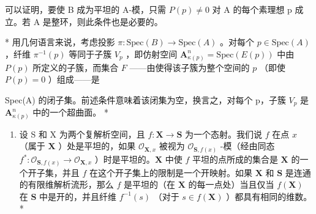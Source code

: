 可以证明，要使 B 成为平坦的 A-模，只需 \(P(p) \neq 0\) 对 A 的每个素理想 p 成立。若 A 是整环，则此条件也是必要的。

* 用几何语言来说，考虑投影 \(\pi: \text{Spec}(B) \to \text{Spec}(A)\) 。对每个 \(p \in \text{Spec}(A)\) ，纤维 \(\pi^{-1}(p)\) 等同于子簇 \(V_p\) ，即仿射空间 \(\mathbf{A}_{\kappa(p)}^n = \text{Spec}(E(p))\) 中由 \(P(p)\) 所定义的子簇，而集合 \(F\) ——由使得该子簇为整个空间的 \(p\) （即使 \(P(p) = 0\) ）组成——是

Spec(A) 的闭子集。前述条件意味着该闭集为空，换言之，对每个 p，子簇 \(V_{p}\) 是 \(\mathbf{A}_{\kappa(p)}^{n}\) 中的一个超曲面。 *

\begin{enumerate}
\def\labelenumi{\arabic{enumi})}
\setcounter{enumi}{10}
\tightlist
\item
  设 S 和 X 为两个复解析空间，且 \(f: \mathbf{X} \to \mathbf{S}\) 为一个态射。我们说 \(f\) 在点 \(x\) （属于 \(\mathbf{X}\) ）处是平坦的，如果 \(\mathcal{O}_{\mathbf{X},x}\) 被视为 \(\mathcal{O}_{\mathbf{S},f(x)}\) -模（经由同态 \(f^{*}: \mathcal{O}_{\mathbf{S},f(x)} \to \mathcal{O}_{\mathbf{X},x}\) ）时是平坦的。\(\mathbf{X}\) 中使 \(f\) 平坦的点所成的集合是 \(\mathbf{X}\) 的一个开子集，并且 \(f\) 在这个开子集上的限制是一个开映射。如果 \(\mathbf{X}\) 和 \(\mathbf{S}\) 是连通的有限维解析流形，那么 \(f\) 是平坦的（在 \(\mathbf{X}\) 的每一点处）当且仅当 \(f(\mathbf{X})\) 在 \(\mathbf{S}\) 中是开的，并且纤维 \(f^{-1}(s)\) （对于 \(s \in f(\mathbf{X})\) ）都具有相同的维数。*
\end{enumerate}

